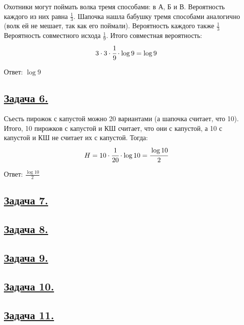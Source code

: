 Охотники могут поймать волка тремя способами: в А, Б и В. Вероятность каждого из них равна $\frac{1}{3}$. 
Шапочка нашла бабушку тремя способами аналогично (волк ей не мешает, так как его поймали). Вероятность каждого также $\frac{1}{3}$
Вероятность совместного исхода $\frac{1}{9}$.
Итого совместная вероятность:
\[3\cdot3\cdot\cfrac{1}{9}\cdot\log9= \log9 \]

Ответ: $\log9$

\subsection*{\hyperref[sec:problem6]{Задача 6.}}\label{sec:sol_problem6}

Съесть пирожок с капустой можно 20 вариантами (а шапочка считает, что 10).
Итого, 10 пирожков с капустой и КШ считает, что они с капустой, а 10 с капустой и КШ не считает их с капустой. 
Тогда:
\[H=10\cdot\cfrac{1}{20}\cdot\log10=\cfrac{\log10}{2}\]

Ответ: $\frac{\log10}{2}$

\subsection*{\hyperref[sec:problem7]{Задача 7.}}\label{sec:sol_problem7}

\subsection*{\hyperref[sec:problem8]{Задача 8.}}\label{sec:sol_problem8}

\subsection*{\hyperref[sec:problem9]{Задача 9.}}\label{sec:sol_problem9}

\subsection*{\hyperref[sec:problem10]{Задача 10.}}\label{sec:sol_problem10}

\subsection*{\hyperref[sec:problem11]{Задача 11.}}\label{sec:sol_problem11}